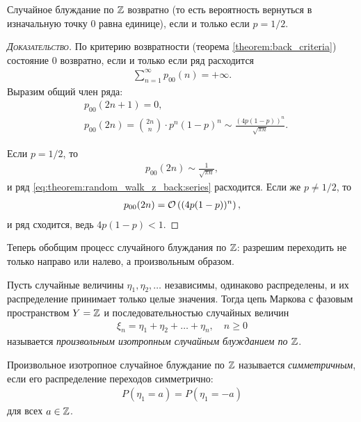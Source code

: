 \documentclass[../main.tex]{subfiles}
\begin{document}
\begin{thm}
 \label{theorem:random_walk_on_Z_d_back}
 Случайное блуждание по $ \mathbb{Z} $ возвратно (то есть вероятность вернуться в изначальную точку $ 0 $ равна единице), если и только если $ p = 1 / 2 $.
\end{thm}
\begin{proof}[\normalfont\textsc{Доказательство}]
 По критерию возвратности (теорема \ref{theorem:back_criteria}) состояние $ 0 $ возвратно, если и только если ряд расходится
 \begin{align}
  \label{eq:theorem:random_walk_z_back:series}
  \sum_{n=1}^{\infty}p_{00}(n) = +\infty.
 \end{align} Выразим общий член ряда:
 \begin{align*}
  &p_{00}(2n+1)= 0, \\
  &p_{00}(2n) = \binom{2n} n \cdot p^{n}(1-p)^{n} \sim \frac{(4p(1-p))^{n}}{\sqrt{\pi n}}.
 \end{align*} 

 Если $ p = 1 / 2 $, то
 \begin{align*}
  p_{00}(2n) \sim \frac{1}{\sqrt{\pi n}},
 \end{align*} и ряд \eqref{eq:theorem:random_walk_z_back:series} расходится. Если же $ p \neq 1 / 2 $, то
 \begin{align*}
  p_{00}(2n) = \mathcal{O} \left( (4p(1-p))^{n} \right),
 \end{align*} и ряд сходится, ведь $ 4p(1-p) < 1 $.
\end{proof}

Теперь обобщим процесс случайного блуждания по $ \mathbb{Z} $: разрешим переходить не только направо или налево, а произвольным образом.

\begin{df}
 Пусть случайные величины $ \eta_1,\eta_2,\ldots $ независимы, одинаково распределены, и их распределение принимает только целые значения. Тогда цепь Маркова с фазовым пространством $ Y = \mathbb{Z} $ и последовательностью случайных величин
 \begin{align*}
  \xi_n = \eta_1 + \eta_2 + \ldots + \eta_n, \quad n \geqslant 0
 \end{align*} называется \textit{произвольным изотропным случайным блужданием по $ \mathbb{Z} $}.
\end{df}

\begin{df}
 Произвольное изотропное случайное блуждание по $ \mathbb{Z} $ называется \textit{симметричным}, если его распределение переходов симметрично:
 \begin{align*}
  P(\eta_1 = a) = P(\eta_1 = -a)
 \end{align*} для всех $ a \in \mathbb{Z} $.
\end{df}
\end{document}
